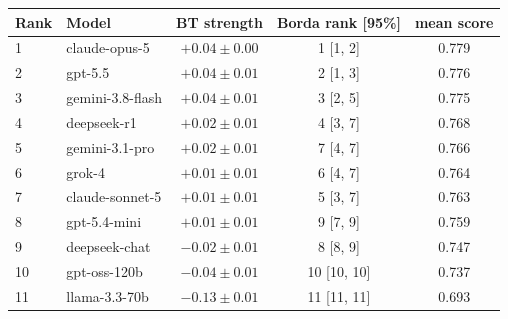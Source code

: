 \begin{tabular}{llccc}
\toprule
Rank & Model & BT strength & Borda rank [95\%] & mean score \\
\midrule
1 & claude-opus-5 & $+0.04 \pm 0.00$ & 1 [1, 2] & 0.779 \\
2 & gpt-5.5 & $+0.04 \pm 0.01$ & 2 [1, 3] & 0.776 \\
3 & gemini-3.8-flash & $+0.04 \pm 0.01$ & 3 [2, 5] & 0.775 \\
4 & deepseek-r1 & $+0.02 \pm 0.01$ & 4 [3, 7] & 0.768 \\
5 & gemini-3.1-pro & $+0.02 \pm 0.01$ & 7 [4, 7] & 0.766 \\
6 & grok-4 & $+0.01 \pm 0.01$ & 6 [4, 7] & 0.764 \\
7 & claude-sonnet-5 & $+0.01 \pm 0.01$ & 5 [3, 7] & 0.763 \\
8 & gpt-5.4-mini & $+0.01 \pm 0.01$ & 9 [7, 9] & 0.759 \\
9 & deepseek-chat & $-0.02 \pm 0.01$ & 8 [8, 9] & 0.747 \\
10 & gpt-oss-120b & $-0.04 \pm 0.01$ & 10 [10, 10] & 0.737 \\
11 & llama-3.3-70b & $-0.13 \pm 0.01$ & 11 [11, 11] & 0.693 \\
\bottomrule
\end{tabular}
